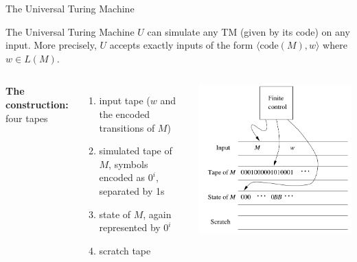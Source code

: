 \documentclass[handout]{beamer}
\begin{document}
\begin{frame}{The Universal Turing Machine}

    The \alert{Universal Turing Machine} $U$ can simulate any TM (given by its code) on any input. More precisely, $U$ accepts exactly inputs of the form \alert{$\langle \mathrm{code}(M),w\rangle$} where \alert{$w\in L(M)$}.
       
    \begin{columns}

        
        \textbf{The construction:}  four tapes
        \begin{enumerate}
            \item input tape ($w$ and the encoded transitions of $M$)
            \item simulated tape of $M$, symbols encoded as $0^i$, separated by 1s
            \item state of $M$, again represented by $0^i$
            \item scratch tape
        \end{enumerate}
    

        \begin{center}
            \includegraphics[width=\textwidth]{files/universalTM.PNG}
        \end{center}        
        
    \end{columns}

\end{frame}
\end{document}
